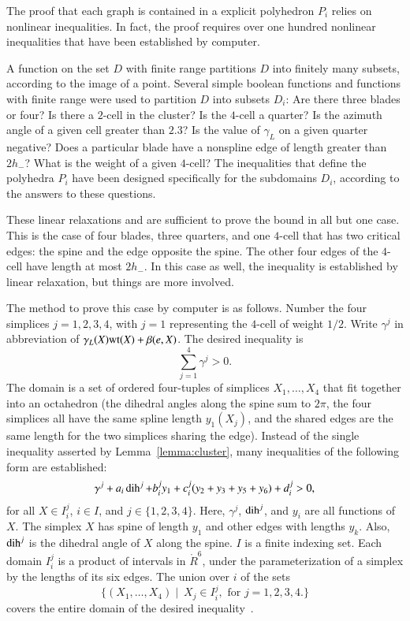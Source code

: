 The proof that each graph is contained in a explicit polyhedron $P_i$ relies on nonlinear inequalities.
In fact, the proof requires over one hundred nonlinear inequalities that have been established by computer.    

A function on the set $D$ with finite range partitions $D$ into finitely many subsets, according to the image of a point.   Several simple boolean functions and functions with finite range were used to partition
 $D$ into subsets $D_i$: Are there three blades or four?  Is there a $2$-cell in the cluster?  Is the $4$-cell a quarter?   Is the    azimuth angle  of a given cell greater than $2.3$?  Is the value of $\gamma_L$ on a given quarter  negative? Does a particular blade have a nonspline edge of length greater than $2h_-$?  What is the weight of a given $4$-cell?  The inequalities that define the polyhedra $P_i$ have been designed specifically for the subdomains $D_i$, according to the answers to these questions.

These linear relaxations and are sufficient to prove the bound in all but one case.  This is the case of four blades, three quarters, and one $4$-cell that has two critical edges: the spine and the edge opposite the spine.  The other four edges of the $4$-cell have length at most $2h_-$.  In this case as well, the inequality is established by linear relaxation, but things are more involved.  

The method to prove this case by computer is as follows.  Number the four simplices $j=1,2,3,4$, with $j=1$ representing the $4$-cell of weight $1/2$.  Write $\gamma^j$ in abbreviation of $\gamma_L(X){\operatorname{wt}}(X) + \beta(e,X)$.   The desired inequality is
\begin{equation}\label{eqn:gpos}
\sum_{j=1}^4 \gamma^j > 0.
\end{equation}
The domain is a set of ordered four-tuples of simplices $X_1,\ldots,X_4$ that fit together into an octahedron (the dihedral angles along the spine sum to $2\pi$, the four simplices all have the same spline length $y_1(X_j)$, and the shared edges are the same length for the two simplices sharing the edge).
Instead of the single inequality asserted by Lemma~\ref{lemma:cluster},  many inequalities of the following form are established:
\begin{equation}\label{eqn:gpart}
\gamma^j + a_i \operatorname{dih}^j + b_i^j y_1 + c_i^j (y_2+y_3+y_5+y_6) + d_i^j > 0, 
\end{equation}
for all $X \in I_i^j$, \quad $i \in I$, and  $j\in \{1,2,3,4\}$.  Here, $\gamma^j$, $\operatorname{dih}^j$, and $y_i$ are
all functions of $X$.
The simplex $X$ has spine of length $y_1$ and other edges with lengths $y_k$.  Also,  $\operatorname{dih}^j$ is the dihedral angle of $X$ along the spine.
$I$ is a finite indexing set.  Each domain $I_i^j$ is a product of intervals in $\ring{R}^6$, under the parameterization of a simplex by the lengths of its six edges.  The union over $i$ of the sets
$$
\{(X_1,\ldots,X_4)\mid~ X_j \in I_i^j,\text{ for } j=1,2,3,4.\}
$$
covers the entire domain of the desired inequality~.   

